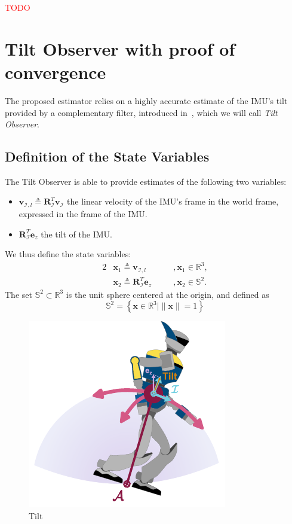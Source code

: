 \documentclass{IJCAS}
\begin{document}
\textcolor{red}{TODO}

\section{Tilt Observer with proof of convergence}
The proposed estimator relies on a highly accurate estimate of the IMU's tilt provided by a complementary filter, introduced in~\cite{benallegue2020LyapunovStableOrientationEstimatorHumanoids}, which we will call \emph{Tilt Observer}. 

\subsection{Definition of the State Variables}
The Tilt Observer is able to provide estimates of the following two variables: 
\begin{itemize}
    \item $\boldsymbol{v}_{\mathcal{I}, l} \triangleq \boldsymbol{R}^{T}_{\mathcal{I}} \boldsymbol{v}_{\mathcal{I}} $ the linear velocity of the IMU's frame in the world frame, expressed in the frame of the IMU.
    \item $\boldsymbol{R}^{T}_{\mathcal{I}} \boldsymbol{e}_z$ the tilt of the IMU.
\end{itemize}
We thus define the state variables: 
\begin{alignat}{2}
&\boldsymbol{x}_{1} \triangleq \boldsymbol{v}_{\mathcal{I}, l} \quad &&, \boldsymbol{x}_{1} \in \mathbb{R}^{3}, \label{eq:x1} \\
&\boldsymbol{x}_{2} \triangleq \boldsymbol{R}^{T}_{\mathcal{I}} \boldsymbol{e}_z \quad &&, \boldsymbol{x}_{2} \in \mathbb{S}^{2}. \label{eq:x2}
\end{alignat} 
The set $\mathbb{S}^{2} \subset \mathbb{R}^{3}$ is the unit sphere centered at the origin, and defined as
\begin{equation}
    \mathbb{S}^{2} = \left\{ \boldsymbol{x} \in \mathbb{R}^{3} \vert \lVert \boldsymbol{x} \rVert=1 \right\}
\end{equation}

\begin{figure}[!t]
\begin{center}
\includegraphics[width=0.5\columnwidth]{Uploaded/Images/tilt.pdf} 
\vskip -0.5pc
\caption{Tilt}\label{fig:tilt}
\end{center}
\vskip -1.5pc
\end{figure}
\end{document}
